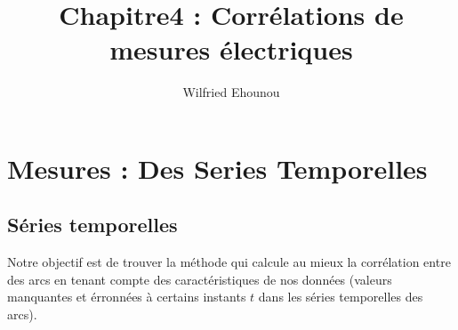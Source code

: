 \documentclass[onecolumn, 12pt]{book}
\title{Chapitre4 : Corr\'elations de mesures \'electriques}
\author{Wilfried Ehounou}
\date{\oldstylenums{\today}}
\begin{document}
\maketitle
\tableofcontents

\chapter{Mesures : Des Series Temporelles}


\section{S\'eries temporelles}



Notre objectif est de trouver la m\'ethode qui calcule au mieux la corr\'elation entre des arcs en tenant compte des caract\'eristiques de nos donn\'ees (valeurs manquantes et \'erronn\'ees \`a certains instants $t$ dans les s\'eries temporelles des arcs).
\end{document}
